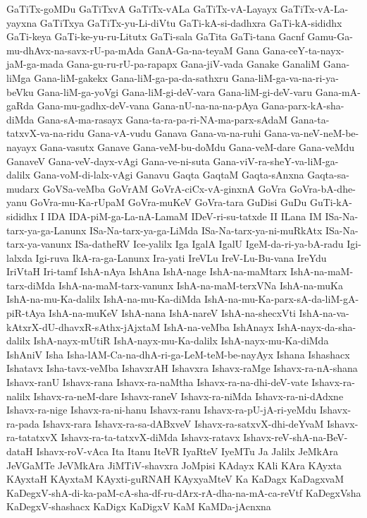 {GaTiTx-goMDu
GaTiTxvA
GaTiTx-vALa
GaTiTx-vA-Layayx
GaTiTx-vA-La-yayxna
GaTiTxya
GaTiTx-yu-Li-diVtu
GaTi-kA-si-dadhxra
GaTi-kA-sididhx
GaTi-keya
GaTi-ke-yu-ru-Litutx
GaTi-sala
GaTita
GaTi-tana
Gacnf
Gamu-Ga-mu-dhAvx-na-savx-rU-pa-mAda
GanA-Ga-na-teyaM
Gana
Gana-ceY-ta-nayx-jaM-ga-mada
Gana-gu-ru-rU-pa-rapapx
Gana-jiV-vada
Ganake
GanaliM
Gana-liMga
Gana-liM-gakekx
Gana-liM-ga-pa-da-sathxru
Gana-liM-ga-va-na-ri-ya-beVku
Gana-liM-ga-yoVgi
Gana-liM-gi-deV-vara
Gana-liM-gi-deV-varu
Gana-mA-gaRda
Gana-mu-gadhx-deV-vana
Gana-nU-na-na-na-pAya
Gana-parx-kA-sha-diMda
Gana-sA-ma-rasayx
Gana-ta-ra-pa-ri-NA-ma-parx-sAdaM
Gana-ta-tatxvX-va-na-ridu
Gana-vA-vudu
Ganava
Gana-va-na-ruhi
Gana-va-neV-neM-be-nayayx
Gana-vasutx
Ganave
Gana-veM-bu-doMdu
Gana-veM-dare
Gana-veMdu
GanaveV
Gana-veV-dayx-vAgi
Gana-ve-ni-suta
Gana-viV-ra-sheY-va-liM-ga-dalilx
Gana-voM-di-lalx-vAgi
Ganavu
Gaqta
GaqtaM
Gaqta-sAnxna
Gaqta-sa-mudarx
GoVSa-veMba
GoVrAM
GoVrA-ciCx-vA-ginxnA
GoVra
GoVra-bA-dhe-yanu
GoVra-mu-Ka-rUpaM
GoVra-muKeV
GoVra-tara
GuDisi
GuDu
GuTi-kA-sididhx
I
IDA
IDA-piM-ga-La-nA-LamaM
IDeV-ri-su-tatxde
II
ILana
IM
ISa-Na-tarx-ya-ga-Lanunx
ISa-Na-tarx-ya-ga-LiMda
ISa-Na-tarx-ya-ni-muRkAtx
ISa-Na-tarx-ya-vanunx
ISa-datheRV
Ice-yalilx
Iga
IgalA
IgalU
IgeM-da-ri-ya-bA-radu
Igi-lalxda
Igi-ruva
IkA-ra-ga-Lanunx
Ira-yati
IreVLu
IreV-Lu-Bu-vana
IreYdu
IriVtaH
Iri-tamf
IshA-nAya
IshAna
IshA-nage
IshA-na-maMtarx
IshA-na-maM-tarx-diMda
IshA-na-maM-tarx-vanunx
IshA-na-maM-terxVNa
IshA-na-muKa
IshA-na-mu-Ka-dalilx
IshA-na-mu-Ka-diMda
IshA-na-mu-Ka-parx-sA-da-liM-gA-piR-tAya
IshA-na-muKeV
IshA-nana
IshA-nareV
IshA-na-shecxVti
IshA-na-va-kAtxrX-dU-dhavxR-sAthx-jAjxtaM
IshA-na-veMba
IshAnayx
IshA-nayx-da-sha-dalilx
IshA-nayx-mUtiR
IshA-nayx-mu-Ka-dalilx
IshA-nayx-mu-Ka-diMda
IshAniV
Isha
Isha-lAM-Ca-na-dhA-ri-ga-LeM-teM-be-nayAyx
Ishana
Ishashacx
Ishatavx
Isha-tavx-veMba
IshavxrAH
Ishavxra
Ishavx-raMge
Ishavx-ra-nA-shana
Ishavx-ranU
Ishavx-rana
Ishavx-ra-naMtha
Ishavx-ra-na-dhi-deV-vate
Ishavx-ra-nalilx
Ishavx-ra-neM-dare
Ishavx-raneV
Ishavx-ra-niMda
Ishavx-ra-ni-dAdxne
Ishavx-ra-nige
Ishavx-ra-ni-hanu
Ishavx-ranu
Ishavx-ra-pU-jA-ri-yeMdu
Ishavx-ra-pada
Ishavx-rara
Ishavx-ra-sa-dABxveV
Ishavx-ra-satxvX-dhi-deYvaM
Ishavx-ra-tatatxvX
Ishavx-ra-ta-tatxvX-diMda
Ishavx-ratavx
Ishavx-reV-shA-na-BeV-dataH
Ishavx-roV-vAca
Ita
Itanu
IteVR
IyaRteV
IyeMTu
Ja
Jalilx
JeMkAra
JeVGaMTe
JeVMkAra
JiMTiV-shavxra
JoMpisi
KAdayx
KAli
KAra
KAyxta
KAyxtaH
KAyxtaM
KAyxti-guRNAH
KAyxyaMteV
Ka
KaDagx
KaDagxvaM
KaDegxV-shA-di-ka-paM-cA-sha-df-ru-dArx-rA-dha-na-mA-ca-reVtf
KaDegxVsha
KaDegxV-shashacx
KaDigx
KaDigxV
KaM
KaMDa-jAcnxna
}
